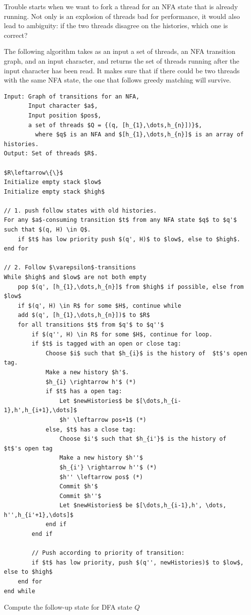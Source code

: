 \documentclass[english]{sigplanconf}
\begin{document}
Trouble starts when we want to fork a thread for an NFA state that
is already running. Not only is an explosion of threads bad for
performance, it would also lead to ambiguity: if the two threads
disagree on the histories, which one is correct?

The following algorithm takes as an input a set of threads, an NFA
transition graph, and an input character, and returns the set of threads
running after the input character has been read. It makes sure that
if there could be two threads with the same NFA state, the one that
follows greedy matching will survive.

\begin{algorithm*}[tb]
\begin{lstlisting}[mathescape,tabsize=2]
Input: Graph of transitions for an NFA,
	   Input character $a$,
	   Input position $pos$,
	   a set of threads $Q = {(q, [h_{1},\dots,h_{n}])}$,
	     where $q$ is an NFA and $[h_{1},\dots,h_{n}]$ is an array of histories.
Output: Set of threads $R$.

$R\leftarrow\{\}$
Initialize empty stack $low$
Initialize empty stack $high$

// 1. push follow states with old histories.
For any $a$-consuming transition $t$ from any NFA state $q$ to $q'$ such that $(q, H) \in Q$.
	if $t$ has low priority push $(q', H)$ to $low$, else to $high$.
end for

// 2. Follow $\varepsilon$-transitions
While $high$ and $low$ are not both empty
	pop $(q', [h_{1},\dots,h_{n}]$ from $high$ if possible, else from $low$
	if $(q', H) \in R$ for some $H$, continue while
	add $(q', [h_{1},\dots,h_{n}])$ to $R$
	for all transitions $t$ from $q'$ to $q''$
		if $(q'', H) \in R$ for some $H$, continue for loop.
		if $t$ is tagged with an open or close tag:
			Choose $i$ such that $h_{i}$ is the history of  $t$'s open tag.
			Make a new history $h'$.
			$h_{i} \rightarrow h'$ (*)
			if $t$ has a open tag:
				Let $newHistories$ be $[\dots,h_{i-1},h',h_{i+1},\dots]$
				$h' \leftarrow pos+1$ (*)
			else, $t$ has a close tag:
				Choose $i'$ such that $h_{i'}$ is the history of  $t$'s open tag
				Make a new history $h''$
				$h_{i'} \rightarrow h''$ (*)
				$h'' \leftarrow pos$ (*)
				Commit $h'$
				Commit $h''$
				Let $newHistories$ be $[\dots,h_{i-1},h', \dots, h'',h_{i'+1},\dots]$
			end if
		end if				
				
		// Push according to priority of transition:
		if $t$ has low priority, push $(q'', newHistories)$ to $low$, else to $high$
	end for
end while
\end{lstlisting}

\caption{Compute the follow-up state for DFA state $Q$}
\end{algorithm*}
\end{document}
